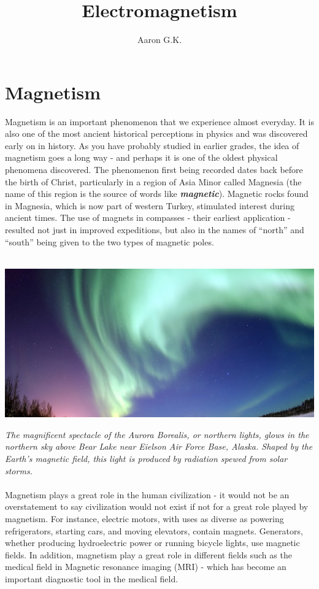 \documentclass[9pt]{article}
\title{Electromagnetism}
\author{Aaron G.K.}
\begin{document}
	\maketitle
	\section*{Magnetism}
	Magnetism is an important phenomenon that we experience almost everyday. It is also one of the most ancient historical perceptions in physics and was discovered early on in history. As you have probably studied in earlier grades, the idea of magnetism goes a long way - and perhaps it is one of the oldest physical phenomena discovered. The phenomenon first being recorded dates back before the birth of Christ, particularly in a region of Asia Minor called Magnesia (the name of this region is the source of words like \textit{\textbf{magnetic}}). Magnetic rocks found in Magnesia, which is now part of western Turkey, stimulated interest during ancient times. The use of magnets in compasses - their earliest application - resulted not just in improved expeditions, but also in the names of “north” and “south” being given to the two types of magnetic poles. \\ \\
	\begin{center}
	\includegraphics*[scale=0.5]{aurora_borealis}
	\end{center}
	\textit{The magnificent spectacle of the Aurora Borealis, or northern lights, glows in the northern sky above Bear Lake near Eielson Air Force Base, Alaska. Shaped by the Earth’s magnetic field, this light is produced by radiation spewed from solar storms.} \\ \\
	Magnetism plays a great role in the human civilization - it would not be an overstatement to say civilization would not exist if not for a great role played by magnetism. For instance, electric motors, with uses as diverse as powering refrigerators, starting cars, and moving elevators, contain magnets. Generators, whether producing hydroelectric power or running bicycle lights, use magnetic fields. In addition, magnetism play a great role in different fields such as the medical field in Magnetic resonance imaging (MRI) - which has become an important diagnostic tool in the medical field.
\end{document}
